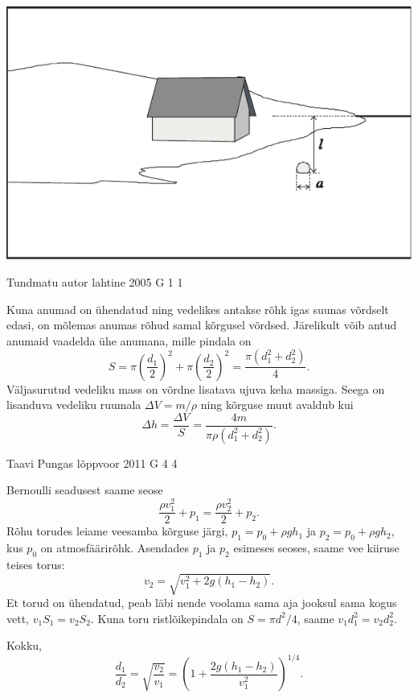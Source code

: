 \documentclass[11pt]{article}
\begin{document}
{{\begin{center}
	\includegraphics[width=0.9\linewidth]{2008-lahg-09-lah}
\end{center}
\fi
}

{Tundmatu autor} %
{lahtine} %
{2005} %
{G 1} %
{1} %
{

\ifSolution
Kuna anumad on ühendatud ning vedelikes antakse rõhk igas suunas võrdselt edasi, on mõlemas anumas rõhud samal kõrgusel võrdsed. Järelikult võib antud anumaid vaadelda ühe anumana, mille pindala on
\[
S=\pi\left(\frac{d_{1}}{2}\right)^{2}+\pi\left(\frac{d_{2}}{2}\right)^{2}=\frac{\pi\left(d_{1}^{2}+d_{2}^{2}\right)}{4}.
\]
Väljasurutud vedeliku mass on võrdne lisatava ujuva keha massiga. Seega on lisanduva vedeliku ruumala $\Delta V = m/\rho$ ning kõrguse muut avaldub kui
\[
\Delta h=\frac{\Delta V}{S}=\frac{4 m}{\pi \rho\left(d_{1}^{2}+d_{2}^{2}\right)}.
\]
\fi
}

{Taavi Pungas} %
{lõppvoor} %
{2011} %
{G 4} %
{4} %
{

\ifSolution
Bernoulli seadusest saame seose 
\[
\frac{\rho v_1^2}{2}+p_1=\frac{\rho v_2^2}{2}+p_2.
\]
Rõhu torudes leiame veesamba kõrguse järgi, $p_1=p_0 + \rho g h_1$ ja $p_2=p_0 + \rho g h_2$, kus $p_0$ on atmosfäärirõhk.
Asendades $p_1$ ja $p_2$ esimeses seoses, saame vee kiiruse teises torus:
\[
v_2=\sqrt{v_1^2+2g(h_1-h_2)}.
\]
Et torud on ühendatud, peab läbi nende voolama sama aja jooksul sama kogus vett, $v_1 S_1 = v_2 S_2$.
Kuna toru ristlõikepindala on $S=\pi d^2 / 4$, saame $v_1 d_1^2 = v_2 d_2^2$.

Kokku,
\[
\frac{d_1}{d_2}=\sqrt{\frac{v_2}{v_1}}=\left(1+\frac{2g(h_1-h_2)}{v_1^2}\right)^{1/4}.
\]
\fi
}

}
\end{document}
